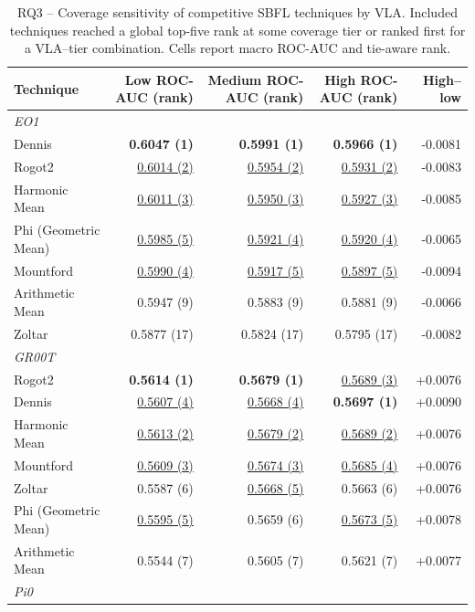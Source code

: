 \begin{table}[t]
\centering
\caption{RQ3 -- Coverage sensitivity of competitive SBFL techniques by VLA. Included techniques reached a global top-five rank at some coverage tier or ranked first for a VLA--tier combination. Cells report macro ROC-AUC and tie-aware rank.}
\label{tab:rq3-technique-sensitivity}
{\scriptsize
\setlength{\tabcolsep}{5pt}
\begin{tabular}{lrrrr}
\toprule
Technique & Low ROC-AUC (rank) & Medium ROC-AUC (rank) & High ROC-AUC (rank) & High--low \\
\midrule
\multicolumn{5}{l}{\textit{EO1}} \\
Dennis & \textbf{0.6047 (1)} & \textbf{0.5991 (1)} & \textbf{0.5966 (1)} & -0.0081 \\
Rogot2 & \underline{0.6014 (2)} & \underline{0.5954 (2)} & \underline{0.5931 (2)} & -0.0083 \\
Harmonic Mean & \underline{0.6011 (3)} & \underline{0.5950 (3)} & \underline{0.5927 (3)} & -0.0085 \\
Phi (Geometric Mean) & \underline{0.5985 (5)} & \underline{0.5921 (4)} & \underline{0.5920 (4)} & -0.0065 \\
Mountford & \underline{0.5990 (4)} & \underline{0.5917 (5)} & \underline{0.5897 (5)} & -0.0094 \\
Arithmetic Mean & 0.5947 (9) & 0.5883 (9) & 0.5881 (9) & -0.0066 \\
Zoltar & 0.5877 (17) & 0.5824 (17) & 0.5795 (17) & -0.0082 \\
\midrule
\multicolumn{5}{l}{\textit{GR00T}} \\
Rogot2 & \textbf{0.5614 (1)} & \textbf{0.5679 (1)} & \underline{0.5689 (3)} & +0.0076 \\
Dennis & \underline{0.5607 (4)} & \underline{0.5668 (4)} & \textbf{0.5697 (1)} & +0.0090 \\
Harmonic Mean & \underline{0.5613 (2)} & \underline{0.5679 (2)} & \underline{0.5689 (2)} & +0.0076 \\
Mountford & \underline{0.5609 (3)} & \underline{0.5674 (3)} & \underline{0.5685 (4)} & +0.0076 \\
Zoltar & 0.5587 (6) & \underline{0.5668 (5)} & 0.5663 (6) & +0.0076 \\
Phi (Geometric Mean) & \underline{0.5595 (5)} & 0.5659 (6) & \underline{0.5673 (5)} & +0.0078 \\
Arithmetic Mean & 0.5544 (7) & 0.5605 (7) & 0.5621 (7) & +0.0077 \\
\midrule
\multicolumn{5}{l}{\textit{Pi0}} \\

\end{tabular}}
\end{table}

